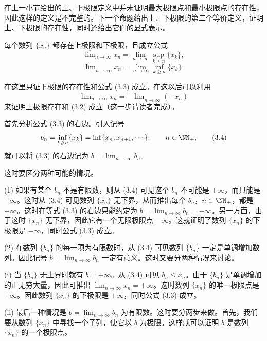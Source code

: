 在上一小节给出的上、下极限定义中并未证明最大极限点和最小极限点的存在性，因此这样的定义是不完整的。下一个命题给出上、下极限的第二个等价定义，证明上、下极限的存在性，同时还给出它们的显式表示。

\begin{xproposition}[3.6.2]
每个数列 $\{x_n\}$ 都存在上极限和下极限，且成立公式
\begin{equation}
  \overline{\lim}_{n\to\infty}x_n
  =\lim_{n\to\infty}\sup_{k\geqslant n}\{x_k\},
  \tag{3.2}
  \label{eq:3.2}
\end{equation}
\begin{equation}
  \underline{\lim}_{n\to\infty}x_n
  =\lim_{n\to\infty}\inf_{k\geqslant n}\{x_k\}.
  \tag{3.3}
  \label{eq:3.3}
\end{equation}
\end{xproposition}
\begin{xproof}
在这里只证下极限的存在性和公式 (3.3) 成立。在这以后可以利用
\[
  \overline{\lim}_{n\to\infty}x_n
  =-\underline{\lim}_{n\to\infty}(-x_n)
\]
来证明上极限存在和 (3.2) 成立（这一步请读者完成）。

首先分析公式 (3.3) 的右边。引入记号
\begin{equation}
  b_n=\inf_{k\geqslant n}\{x_k\}
  =\inf\{x_n,x_{n+1},\cdots\},\qquad n\in\NN_+,
  \tag{3.4}
  \label{eq:3.4}
\end{equation}
就可以将 (3.3) 的右边记为 $b=\lim_{n\to\infty}b_n$。

这时要区分两种可能的情况。

(1) 如果有某个 $b_n$ 不是有限数，则从 (3.4) 可见这个 $b_n$ 不可能是 $+\infty$，而只能是 $-\infty$。这时从 (3.4) 可见数列 $\{x_n\}$ 无下界，从而推出每个 $b_n$，$n\in\NN_+$，都是 $-\infty$。这时在等式 (3.3) 的右边只能约定为 $b=\lim_{n\to\infty}b_n=-\infty$。另一方面，由于这时 $\{x_n\}$ 无下界，因此它有一个无限极限点 $-\infty$。这就证明了数列 $\{x_n\}$ 的下极限是 $-\infty$，同时公式 (3.3) 成立。

(2) 在数列 $\{b_n\}$ 的每一项为有限数时，从 (3.4) 可见数列 $\{b_n\}$ 一定是单调增加数列。因此记号 $b=\lim_{n\to\infty}b_n$ 一定有意义。这时又要分两种情况来讨论。

(i) 当 $\{b_n\}$ 无上界时就有 $b=+\infty$。从 (3.4) 可见 $b_n\leqslant x_n$。由于 $\{b_n\}$ 是单调增加的正无穷大量，因此可推出 $\lim_{n\to\infty}x_n=+\infty$。这时数列 $\{x_n\}$ 的唯一极限点是 $+\infty$。因此数列 $\{x_n\}$ 的下极限是 $+\infty$，同时公式 (3.3) 成立。

(ii) 最后一种情况是 $b=\lim_{n\to\infty}b_n$ 为有限数。这时要分两步来做。首先，我们要从数列 $\{x_n\}$ 中寻找一个子列，使它以 $b$ 为极限。这样就可以证明 $b$ 是数列 $\{x_n\}$ 的一个极限点。


\end{xproof}
